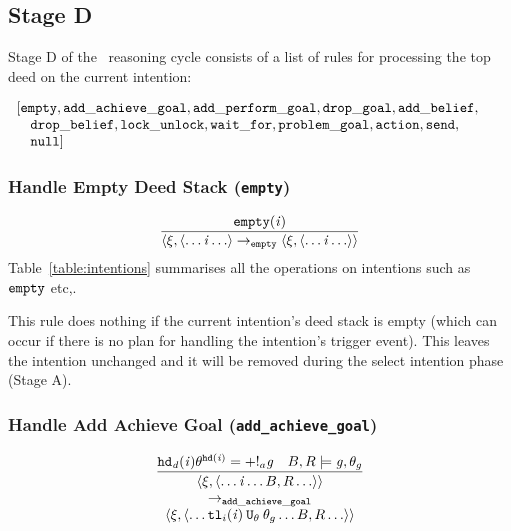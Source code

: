 \subsection{Stage D}

Stage D of the \gwendolen\ reasoning cycle consists of a list of rules for processing the top deed on the current intention:

$  \begin{array}{l}
  [ {\tt empty}, {\tt add\_achieve\_goal}, {\tt add\_perform\_goal}, {\tt drop\_goal}, {\tt add\_belief}, \\
    \quad {\tt drop\_belief}, {\tt lock\_unlock}, {\tt wait\_for}, {\tt problem\_goal}, {\tt action}, {\tt send}, \\
          \quad {\tt null} ]
  \end{array}$

\subsubsection*{Handle Empty Deed Stack ({\tt empty})}

\begin{equation}
\frac{{\tt empty}(\mathit{i})}{\langle \xi, \langle \ldots \mathit{i} \ldots \rangle \rightarrow_{\tt empty} \langle \xi, \langle \ldots \mathit{i} \ldots \rangle \rangle}
\end{equation}
Table~\ref{table:intentions} summarises all the operations on intentions such as ${\tt empty}$ etc,.

This rule does nothing if the current intention's deed stack is empty (which can occur if there is no plan for handling the intention's trigger event).  This leaves the intention unchanged and it will be removed during the select intention phase (Stage A).


\subsubsection*{Handle Add Achieve Goal ({\tt add\_achieve\_goal})}

\begin{equation}
\frac{\mathit{{\tt hd}_d}(\mathit{i})\theta^{{\tt hd}(\mathit{i})} = +!_{a}\mathit{g}
\quad B, R \models  \mathit{g}, \theta_g
}{
  \begin{array}{c}
\langle \xi, \langle \ldots  \mathit{i} \ldots B, R \ldots \rangle \rangle\\ \rightarrow_{\tt add\_achieve\_goal}  \\
\langle \xi, \langle \ldots {\tt tl}_i(\mathit{i}) \: {\tt U}_{\theta} \:
\theta_g \ldots B, R \ldots \rangle \rangle 
\end{array}
}
\end{equation}


